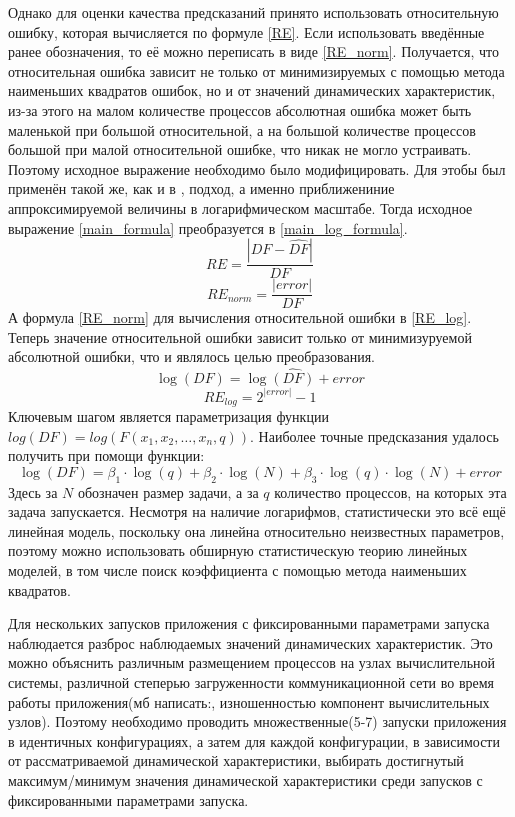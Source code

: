 	Однако для оценки качества предсказаний принято использовать относительную ошибку, которая вычисляется по формуле \ref{RE}. Если использовать введённые ранее обозначения, то её можно переписать в виде \ref{RE_norm}. Получается, что относительная ошибка зависит не только от минимизируемых с помощью метода наименьших квадратов ошибок, но и от значений динамических характеристик, из-за этого на малом количестве процессов абсолютная ошибка может быть маленькой при большой относительной, а на большой количестве процессов большой при малой относительной ошибке, что никак не могло устраивать. Поэтому исходное выражение необходимо было модифицировать. Для этобы был применён такой же, как и в \cite{log_main}, подход, а именно приближениние аппроксимируемой величины в логарифмическом масштабе. Тогда исходное выражение \ref{main_formula} преобразуется в \eqref{main_log_formula}.
	\begin{equation}
		\label{RE} 
		RE = \frac{|DF - \hat{DF}|}{DF}
	\end{equation}
	\begin{equation}
		\label{RE_norm}
		RE_{norm} = \frac{|error|}{DF}
	\end{equation}
	А формула \ref{RE_norm} для вычисления относительной ошибки в \ref{RE_log}. Теперь значение относительной ошибки зависит только от минимизуруемой абсолютной ошибки, что и являлось целью преобразования.
	\begin{equation}\label{main_log_formula}
	\log{(DF)} = \log{\hat{(DF)}} + error
	\end{equation}
	\begin{equation}
		\label{RE_log}
		RE_{log}= 2^{|error|} - 1
	\end{equation}
	Ключевым шагом является параметризация функции \(log(DF) = log(F(x_1, x_2, \ldots, x_n, q))\). Наиболее точные предсказания удалось получить при помощи функции:
	\begin{equation}
	\log{(DF)} = \beta_{1} \cdot \log{(q)} + \beta_{2} \cdot \log{(N)} + \beta_{3} \cdot \log{(q)} \cdot \log{(N)} + error 
	\end{equation}
	Здесь за \(N\) обозначен размер задачи, а за \(q\) количество процессов, на которых эта задача запускается. Несмотря на наличие логарифмов, статистически это всё ещё линейная модель, поскольку она линейна относительно неизвестных параметров, поэтому можно использовать обширную статистическую теорию линейных моделей, в том числе поиск коэффициента с помощью метода наименьших квадратов.


	Для нескольких запусков приложения с фиксированными параметрами запуска наблюдается разброс наблюдаемых значений динамических характеристик. Это можно объяснить различным размещением процессов на узлах вычислительной системы, различной степерью загруженности коммуникационной сети во время работы приложения(мб написать:, изношенностью компонент вычислительных узлов). Поэтому необходимо проводить множественные(5-7) запуски приложения в идентичных конфигурациях, а затем для каждой конфигурации, в зависимости от рассматриваемой динамической характеристики, выбирать достигнутый максимум/минимум значения динамической характеристики среди запусков с фиксированными параметрами запуска.

